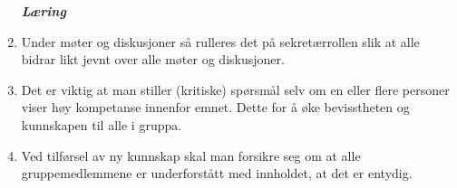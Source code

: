 \begin{enumerate}
\bf{\textit{Læring}}

\item Under møter og diskusjoner så rulleres det på sekretærrollen slik at alle bidrar likt jevnt over alle møter og diskusjoner.

\item Det er viktig at man stiller (kritiske) spørsmål selv om en eller flere personer viser høy kompetanse innenfor emnet. Dette for å øke bevisstheten og kunnskapen til alle i gruppa.

\item Ved tilførsel av ny kunnskap skal man forsikre seg om at alle gruppemedlemmene er underforstått med innholdet, at det er entydig.
\end{enumerate}
